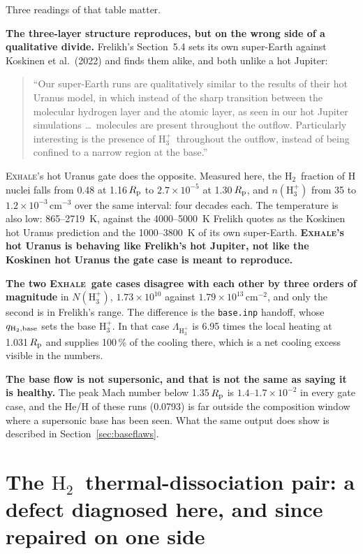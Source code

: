 \documentclass[english,a4paper]{my_memo}
\newcommand{\Rp}{R_{\rm p}}
\newcommand{\EXHALE}{\textsc{Exhale}}
\newcommand{\Hth}{\ensuremath{\mathrm{H}_3^+}}
\newcommand{\Htwo}{\ensuremath{\mathrm{H}_2}}
\begin{document}
Three readings of that table matter.

\textbf{The three-layer structure reproduces, but on the wrong side of a
qualitative divide.} Frelikh's Section~5.4 sets its own super-Earth against
Koskinen et al.\ (2022) and finds them alike, and both unlike a hot Jupiter:
\begin{quote}\small
``Our super-Earth runs are qualitatively similar to the results of their hot
Uranus model, in which instead of the sharp transition between the molecular
hydrogen layer and the atomic layer, as seen in our hot Jupiter simulations
\ldots\ molecules are present throughout the outflow. Particularly interesting
is the presence of \Hth\ throughout the outflow, instead of being confined to
a narrow region at the base.''
\end{quote}
\EXHALE's hot Uranus gate does the opposite. Measured here, the \Htwo\
fraction of H nuclei falls from 0.48 at 1.16\,$\Rp$ to
$2.7\times10^{-5}$ at 1.30\,$\Rp$, and $n(\Hth)$ from 35 to
$1.2\times10^{-3}$\,cm$^{-3}$ over the same interval: four decades each.
The temperature is also low: 865--2719~K, against the 4000--5000~K Frelikh
quotes as the Koskinen hot Uranus prediction and the 1000--3800~K of its own
super-Earth. \textbf{\EXHALE's hot Uranus is behaving like Frelikh's hot
Jupiter, not like the Koskinen hot Uranus the gate case is meant to
reproduce.}

\textbf{The two \EXHALE\ gate cases disagree with each other by three orders
of magnitude} in $N(\Hth)$, $1.73\times10^{10}$ against
$1.79\times10^{13}$\,cm$^{-2}$, and only the second is in Frelikh's range.
The difference is the \texttt{base.inp} handoff, whose $q_{\rm H_2,base}$ sets
the base \Hth. In that case $\Lambda_{\Hth}$ is 6.95 times the local heating
at 1.031\,$\Rp$ and supplies 100\,\% of the cooling there, which is a net
cooling excess visible in the numbers.

\textbf{The base flow is not supersonic, and that is not the same as saying it
is healthy.} The peak Mach number below 1.35\,$\Rp$ is
$1.4$--$1.7\times10^{-2}$ in every gate case, and the He/H of these runs
(0.0793) is far outside the composition window where a supersonic base has
been seen. What the same output does show is described in
Section~\ref{sec:baseflaws}.

\section{The \Htwo\ thermal-dissociation pair: a defect diagnosed here, and
since repaired on one side}
\label{sec:detbal}
\end{document}
